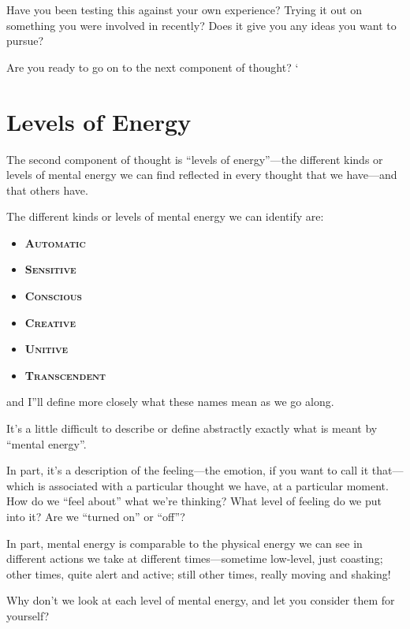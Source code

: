 \documentclass[a5paper]{article}
\begin{document}
Have you been testing this against your own experience?
Trying it out on something you were involved in recently?
Does it give you any ideas you want to pursue?

Are you ready to go on to the next component of thought? `

\section{Levels of Energy}
The second component of thought is ``levels of energy''---the different kinds or levels of mental energy we can find reflected in every thought that we have---and that others have.

The different kinds or levels of mental energy we can identify are:
\begin{itemize}
  \item \textbf{\scshape Automatic}
  \item \textbf{\scshape Sensitive}
  \item \textbf{\scshape Conscious}
  \item \textbf{\scshape Creative}
  \item \textbf{\scshape Unitive}
  \item \textbf{\scshape Transcendent}
\end{itemize}
and I''ll define more closely what these names mean as we go along.

It's a little difficult to describe or define abstractly exactly what is meant by ``mental energy''.

In part, it's a description of the feeling---the emotion, if you want to call it that---which is associated with a particular thought we have, at a particular moment.
How do we ``feel about'' what we're thinking?
What level of feeling do we put into it?
Are we ``turned on'' or ``off''?

In part, mental energy is comparable to the physical energy we can see in different actions we take at different times---sometime low-level, just coasting; other times, quite alert and active; still other times, really
moving and shaking!

Why don't we look at each level of mental energy, and let you consider them for yourself?
\end{document}
